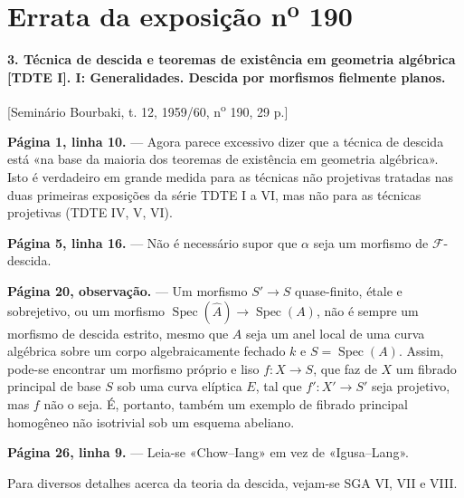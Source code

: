 \clearpage
\chapter*{Errata da exposição n\textsuperscript{o} 190}
\setcounter{footnote}{0}

\noindent\textbf{3. Técnica de descida e teoremas de existência em geometria
algébrica [TDTE I]. I: Generalidades. Descida por morfismos fielmente planos.}

\begin{center}
[Seminário Bourbaki, t. 12, 1959/60, n\textsuperscript{o} 190, 29 p.]
\end{center}

\noindent\textbf{Página 1, linha 10.} --- Agora parece excessivo dizer que a
técnica de descida está «na base da maioria dos teoremas de
existência em geometria algébrica». Isto é verdadeiro em grande medida para as
técnicas não projetivas tratadas nas duas primeiras exposições
da série TDTE I a VI, mas não para as técnicas projetivas (TDTE IV, V,
VI).

\noindent\textbf{Página 5, linha 16.} --- Não é necessário supor que $\alpha$
seja um morfismo de $\mathcal F$-descida.

\noindent\textbf{Página 20, observação.} --- Um morfismo
$S'\longrightarrow S$ quase-finito, étale e sobrejetivo, ou um morfismo
$\operatorname{Spec}(\widehat A)\longrightarrow\operatorname{Spec}(A)$, não é
sempre um morfismo de descida estrito, mesmo que $A$ seja um anel local de uma
curva algébrica sobre um corpo algebraicamente fechado $k$ e
$S=\operatorname{Spec}(A)$. Assim, pode-se encontrar um morfismo próprio e liso
$f:X\longrightarrow S$, que faz de $X$ um fibrado principal de base $S$ sob
uma curva elíptica $E$, tal que $f':X'\longrightarrow S'$ seja projetivo, mas
$f$ não o seja. É, portanto, também um exemplo de fibrado
principal homogêneo não isotrivial sob um esquema abeliano.

\noindent\textbf{Página 26, linha 9.} --- Leia-se «Chow--Iang» em vez de
«Igusa--Lang».

Para diversos detalhes acerca da teoria da descida, vejam-se SGA VI, VII e
VIII.
